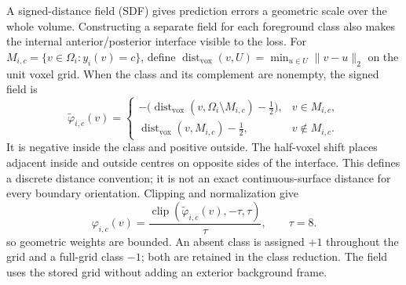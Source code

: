 \documentclass[12pt,a4paper]{article}
\begin{document}
A signed-distance field (SDF) gives prediction errors a geometric scale over the whole
volume. Constructing a separate field for each foreground class also
makes the internal anterior/posterior interface visible to the loss.
For $M_{i,c}=\{v\in\Omega_i:y_i(v)=c\}$, define
$\operatorname{dist}_{\mathrm{vox}}(v,U)=\min_{u\in U}\|v-u\|_2$
on the unit voxel grid. When the class and its complement are nonempty,
the signed field is
\begin{equation}
\widetilde\varphi_{i,c}(v)=
\begin{cases}
-\bigl(\operatorname{dist}_{\mathrm{vox}}
       (v,\Omega_i\setminus M_{i,c})-\tfrac12\bigr),
   &v\in M_{i,c},\\[0.4em]
\operatorname{dist}_{\mathrm{vox}}(v,M_{i,c})-\tfrac12,
   &v\notin M_{i,c}.
\end{cases}
\label{eq:sdf-half-voxel-field}
\end{equation}
It is negative inside the class and positive outside. The half-voxel
shift places adjacent inside and outside centres on opposite sides of
the interface. This defines a discrete distance convention; it is not
an exact continuous-surface distance for every boundary orientation.
Clipping and normalization give
\begin{equation}
\varphi_{i,c}(v)
=\frac{\operatorname{clip}
  (\widetilde\varphi_{i,c}(v),-\tau,\tau)}{\tau},
\qquad \tau=8.
\label{eq:sdf-clipped-normalized-field}
\end{equation}
so geometric weights are bounded. An absent class is assigned $+1$
throughout the grid and a full-grid class $-1$; both are retained in
the class reduction. The field uses the stored grid without adding an
exterior background frame.
\end{document}
